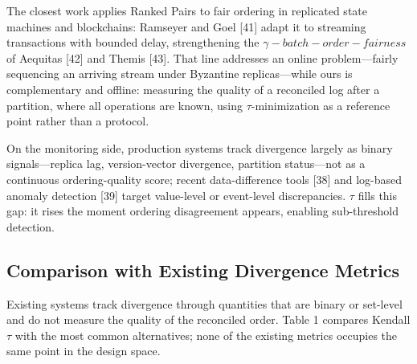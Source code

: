\documentclass[11pt]{article}
\begin{document}
The closest work applies Ranked Pairs to fair ordering in replicated state machines and blockchains: Ramseyer and Goel [41] adapt it to streaming transactions with bounded delay, strengthening the $\gamma -batch-order-fairness$ of Aequitas [42] and Themis [43]. That line addresses an online problem—fairly sequencing an arriving stream under Byzantine replicas—while ours is complementary and offline: measuring the quality of a reconciled log after a partition, where all operations are known, using $\tau $-minimization as a reference point rather than a protocol.

On the monitoring side, production systems track divergence largely as binary signals—replica lag, version-vector divergence, partition status—not as a continuous ordering-quality score; recent data-difference tools [38] and log-based anomaly detection [39] target value-level or event-level discrepancies. $\tau $ fills this gap: it rises the moment ordering disagreement appears, enabling sub-threshold detection.

\subsection{Comparison with Existing Divergence Metrics}
Existing systems track divergence through quantities that are binary or set-level and do not measure the quality of the reconciled order. Table 1 compares Kendall $\tau $ with the most common alternatives; none of the existing metrics occupies the same point in the design space.
\end{document}
